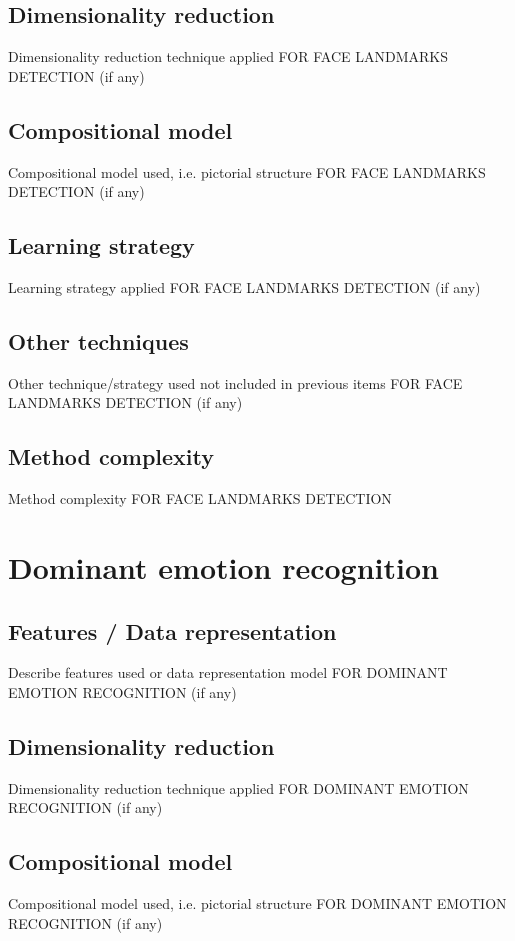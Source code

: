 \documentclass{article}
\begin{document}
\subsection{Dimensionality reduction}
Dimensionality reduction technique applied FOR FACE LANDMARKS DETECTION (if any)

\subsection{Compositional model}
Compositional model used, i.e. pictorial structure FOR FACE LANDMARKS DETECTION (if any)

\subsection{Learning strategy}
Learning strategy applied FOR FACE LANDMARKS DETECTION (if any)

\subsection{Other techniques}
Other technique/strategy used not included in previous items FOR FACE LANDMARKS DETECTION (if any)

\subsection{Method complexity}
Method complexity FOR FACE LANDMARKS DETECTION


\section{Dominant emotion recognition}
\subsection{Features / Data representation}
Describe features used or data representation model FOR DOMINANT EMOTION RECOGNITION (if any)

\subsection{Dimensionality reduction}
Dimensionality reduction technique applied FOR DOMINANT EMOTION RECOGNITION (if any)

\subsection{Compositional model}
Compositional model used, i.e. pictorial structure FOR DOMINANT EMOTION RECOGNITION (if any)
\end{document}
